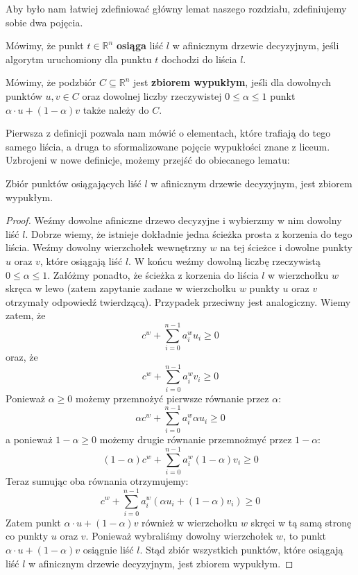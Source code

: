 Aby było nam łatwiej zdefiniować główny lemat naszego rozdziału, zdefiniujemy sobie dwa pojęcia.
\begin{definition}
 Mówimy, że punkt $t \in \mathbb{R}^n$ \textbf{osiąga} liść $l$ w afinicznym drzewie decyzyjnym, jeśli algorytm uruchomiony dla punktu $t$ dochodzi do liścia $l$.
\end{definition}
\begin{definition}
 Mówimy, że podzbiór $C \subseteq \mathbb{R}^n$ jest \textbf{zbiorem wypukłym}, jeśli dla dowolnych punktów $u, v \in C$ oraz dowolnej liczby rzeczywistej $0 \leq \alpha \leq 1$ punkt $\alpha \cdot u + (1 - \alpha) v$ także należy do $C$.
\end{definition}
Pierwsza z definicji pozwala nam mówić o elementach, które trafiają do tego samego liścia, a druga to sformalizowane pojęcie wypukłości znane z liceum.
Uzbrojeni w nowe definicje, możemy przejść do obiecanego lematu:

\begin{lemma}
 Zbiór punktów osiągających liść $l$ w afinicznym drzewie decyzyjnym, jest zbiorem wypukłym.
 \label{uniqness-lemma}
\end{lemma}

\begin{proof}
 Weźmy dowolne afiniczne drzewo decyzyjne i wybierzmy w nim dowolny liść $l$.
 Dobrze wiemy, że istnieje dokładnie jedna ścieżka prosta z korzenia do tego liścia.
 Weźmy dowolny wierzchołek wewnętrzny $w$ na tej ścieżce i dowolne punkty $u$ oraz $v$, które osiągają liść $l$.
 W końcu weźmy dowolną liczbę rzeczywistą $0 \leq \alpha \leq 1$.
 Załóżmy ponadto, że ścieżka z korzenia do liścia $l$ w wierzchołku $w$ skręca w lewo (zatem zapytanie zadane w wierzchołku $w$ punkty $u$ oraz $v$ otrzymały odpowiedź twierdzącą).
 Przypadek przeciwny jest analogiczny.
 Wiemy zatem, że
\[
 c^w + \sum_{i=0}^{n-1} a_i^w u_i \geq 0
\]
 oraz, że
\[
 c^w + \sum_{i=0}^{n-1} a_i^w v_i \geq 0
\]
 Ponieważ $\alpha \geq 0$ możemy przemnożyć pierwsze równanie przez $\alpha$:
\[
 \alpha c^w + \sum_{i=0}^{n-1} a_i^w \alpha u_i \geq 0
\]
 a ponieważ $1 - \alpha \geq 0$ możemy drugie równanie przemnożmyć przez $1 - \alpha$:
\[
 (1 - \alpha) c^w + \sum_{i=0}^{n-1} a_i^w (1 - \alpha) v_i \geq 0
\]
Teraz sumując oba równania otrzymujemy:
\[
 c^w + \sum_{i=0}^{n-1} a_i^w (\alpha u_i + (1 - \alpha) v_i) \geq 0
\]
Zatem punkt $\alpha \cdot u + (1 - \alpha) v$ również w wierzchołku $w$ skręci w tą samą stronę co punkty $u$ oraz $v$.
Ponieważ wybraliśmy dowolny wierzchołek $w$, to punkt $\alpha \cdot u + (1 - \alpha) v$ osiągnie liść $l$.
Stąd zbiór wszystkich punktów, które osiągają liść $l$ w afinicznym drzewie decyzyjnym, jest zbiorem wypukłym.
\end{proof}

